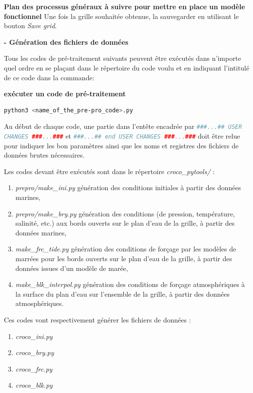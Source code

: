 \documentclass[10pt,a4paper,titlepage]{article}
\begin{document}
\begin{processEnv}{\textbf{Plan des processus généraux à suivre pour mettre en place un modèle fonctionnel}}
    Une fois la grille souhaitée obtenue, la sauvegarder en utilisant le bouton \textit{Save grid}.

    \textbf{- Génération des fichiers de données}

    Tous les codes de pré-traitement suivants peuvent être exécutés dans n'importe quel ordre en se plaçant dans le répertoire du code voulu et en indiquant l'intitulé de ce code dans la commande:

    \begin{codeEnv}{\textbf{exécuter un code de pré-traitement}}
\begin{lstlisting}[language=bash]
python3 <name_of_the_pre-pro_code>.py
\end{lstlisting}
    \end{codeEnv}

    Au début de chaque code, une partie dans l'entête encadrée par \lstinline[language=python]|###...## USER CHANGES ###...###| et \lstinline[language=python]|###...## end USER CHANGES ###...###| doit être relue pour indiquer les bon paramètres ainsi que les noms et registres des fichiers de données brutes nécessaires.

    Les codes devant être exécutés sont dans le répertoire \textit{croco\_pytools/} :

    \begin{enumerate}
        \item \textit{prepro/make\_ini.py} génération des conditions initiales à partir des données marines,
        \item \textit{prepro/make\_bry.py} génération des conditions (de pression, température, salinité, etc.) aux bords ouverts sur le plan d'eau de la grille, à partir des données marines,
        \item \textit{make\_frc\_tide.py} génération des conditions de forçage par les modèles de marrées pour les bords ouverts sur le plan d'eau de la grille, à partir des données issues d'un modèle de marée,
        \item \textit{make\_blk\_interpol.py} génération des conditions de forçage atmosphériques à la surface du plan d'eau sur l'ensemble de la grille, à partir des données atmosphériques.
    \end{enumerate}

    Ces codes vont respectivement générer les fichiers de données :

    \begin{enumerate}
        \item \textit{croco\_ini.py}
        \item \textit{croco\_bry.py}
        \item \textit{croco\_frc.py}
        \item \textit{croco\_blk.py}
    \end{enumerate}


\end{processEnv}
\end{document}
